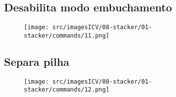 \newpage
\thispagestyle{fancy}
\vspace{\fill}
\subsection{\small Desabilita modo embuchamento}
\begin{figure}
    \centering
    \texttt{[image: src/imagesICV/08-stacker/01-stacker/commands/11.png]}
\end{figure}

\newpage
\thispagestyle{fancy}
\vspace{\fill}
\subsection{\small Separa pilha}
\begin{figure}
    \centering
    \texttt{[image: src/imagesICV/08-stacker/01-stacker/commands/12.png]}
\end{figure}

